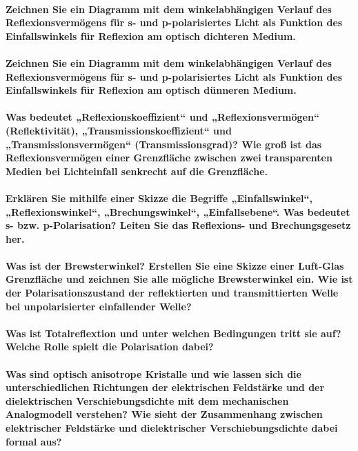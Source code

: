 \documentclass[a4paper, 11pt, parskip=half]{scrartcl}
\begin{document}
\paragraph{Zeichnen Sie ein Diagramm mit dem winkelabhängigen Verlauf des Reflexionsvermögens für s-
und p-polarisiertes Licht als Funktion des Einfallswinkels für Reflexion am optisch dichteren
Medium.}

\paragraph{Zeichnen Sie ein Diagramm mit dem winkelabhängigen Verlauf des Reflexionsvermögens für s-
und p-polarisiertes Licht als Funktion des Einfallswinkels für Reflexion am optisch dünneren
Medium.}

\paragraph{Was bedeutet „Reflexionskoeffizient“ und „Reflexionsvermögen“ (Reflektivität),
„Transmissionskoeffizient“ und „Transmissionsvermögen“ (Transmissionsgrad)? Wie groß ist das
Reflexionsvermögen einer Grenzfläche zwischen zwei transparenten Medien bei Lichteinfall senkrecht
auf die Grenzfläche.}

\paragraph{Erklären Sie mithilfe einer Skizze die Begriffe „Einfallswinkel“, „Reflexionswinkel“, „Brechungswinkel“, „Einfallsebene“. Was bedeutet s- bzw. p-Polarisation? Leiten Sie das Reflexions-
und Brechungsgesetz her.}

\paragraph{Was ist der Brewsterwinkel? Erstellen Sie eine Skizze einer Luft-Glas Grenzfläche und
zeichnen Sie alle mögliche Brewsterwinkel ein. Wie ist der Polarisationszustand der reflektierten
und transmittierten Welle bei unpolarisierter einfallender Welle?}

\paragraph{Was ist Totalreflextion und unter welchen Bedingungen tritt sie auf? Welche Rolle spielt
die Polarisation dabei?}

\paragraph{Was sind optisch anisotrope Kristalle und wie lassen sich die unterschiedlichen
Richtungen der elektrischen Feldstärke und der dielektrischen Verschiebungsdichte mit dem
mechanischen Analogmodell verstehen? Wie sieht der Zusammenhang zwischen elektrischer Feldstärke und dielektrischer Verschiebungsdichte dabei formal aus?}
\end{document}
